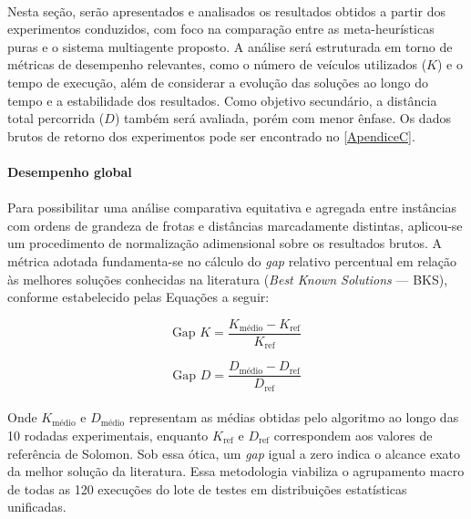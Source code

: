 \paragraph{} Nesta seção, serão apresentados e analisados os resultados obtidos a partir dos experimentos conduzidos, com foco na comparação entre as meta-heurísticas puras e o sistema multiagente proposto. A análise será estruturada em torno de métricas de desempenho relevantes, como o número de veículos utilizados ($K$) e o tempo de execução, além de considerar a evolução das soluções ao longo do tempo e a estabilidade dos resultados. Como objetivo secundário, a distância total percorrida ($D$) também será avaliada, porém com menor ênfase. Os dados brutos de retorno dos experimentos pode ser encontrado no \autoref{ApendiceC}.


\paragraph{Desempenho global}

\paragraph{}
Para possibilitar uma análise comparativa equitativa e agregada entre instâncias com ordens de grandeza de frotas e distâncias marcadamente distintas, aplicou-se um procedimento de normalização adimensional sobre os resultados brutos. A métrica adotada fundamenta-se no cálculo do \textit{gap} relativo percentual em relação às melhores soluções conhecidas na literatura (\textit{Best Known Solutions} — BKS), conforme estabelecido pelas Equações a seguir:

$$\text{Gap } K = \frac{K_{\text{médio}} - K_{\text{ref}}}{K_{\text{ref}}}$$

$$\text{Gap } D = \frac{D_{\text{médio}} - D_{\text{ref}}}{D_{\text{ref}}}$$

\paragraph{}
Onde $K_{\text{médio}}$ e $D_{\text{médio}}$ representam as médias obtidas pelo algoritmo ao longo das 10 rodadas experimentais, enquanto $K_{\text{ref}}$ e $D_{\text{ref}}$ correspondem aos valores de referência de Solomon. Sob essa ótica, um \textit{gap} igual a zero indica o alcance exato da melhor solução da literatura. Essa metodologia viabiliza o agrupamento macro de todas as 120 execuções do lote de testes em distribuições estatísticas unificadas.


